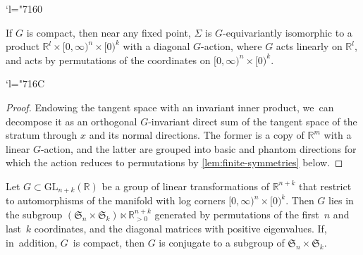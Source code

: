 \documentclass[10pt]{amsart}
\newcommand{\Changel}{\mathcode`l="7160}
\newcommand{\Changelback}{\mathcode`l="716C}
\theoremstyle{definition}
\theoremstyle{remark}
\newcommand{\RR}{\mathbb{R}}
\newcommand{\model}[2]{\halfspc{#1}\times[0)^{#2}}
\newcommand{\halfspc}[1]{[0,\infty)^{#1}}
\newcommand{\Sig}{\Sigma}
\newcommand{\GL}[2]{\mathrm{GL}_{#1}(#2)}
\newcommand{\symgp}[1]{\mathfrak{S}_{#1}}
\begin{document}
\Changel
\begin{corollary}\label{cor:local-action}
If $G$ is compact, then near any fixed point, $\Sig$ is $G$\nobreakdash-equivariantly isomorphic to a product $\RR^l \times \model{n}{k}$ with a diagonal $G$\nobreakdash-action, where $G$ acts linearly on $\RR^l$, and acts by permutations of the coordinates on $\model{n}{k}$.
\end{corollary}
\Changelback

\begin{proof}
Endowing the tangent space with an invariant inner product, we~can decompose it as an orthogonal $G$\nobreakdash-invariant direct sum of the tangent space of the stratum through $x$ and its normal directions. The former is a copy of $\RR^m$ with a linear $G$\nobreakdash-action, and the latter are grouped into basic and phantom directions for which the action reduces to permutations by \autoref{lem:finite-symmetries} below.
\end{proof}

\begin{lemma}\label{lem:finite-symmetries}
Let $G \subset \GL{n+k}{\RR}$ be a group of linear transformations of $\RR^{n+k}$ that restrict to automorphisms of the manifold with log corners $\model{n}{k}$. Then $G$ lies in the subgroup $(\symgp{n}\times\symgp{k})\ltimes \RR_{>0}^{n+k}$ generated by permutations of the first~$n$ and last~$k$ coordinates, and the diagonal matrices with positive eigenvalues. If, in~addition, $G$~is compact, then $G$ is conjugate to a subgroup of $\symgp{n}\times\symgp{k}$.
\end{lemma}
\end{document}
